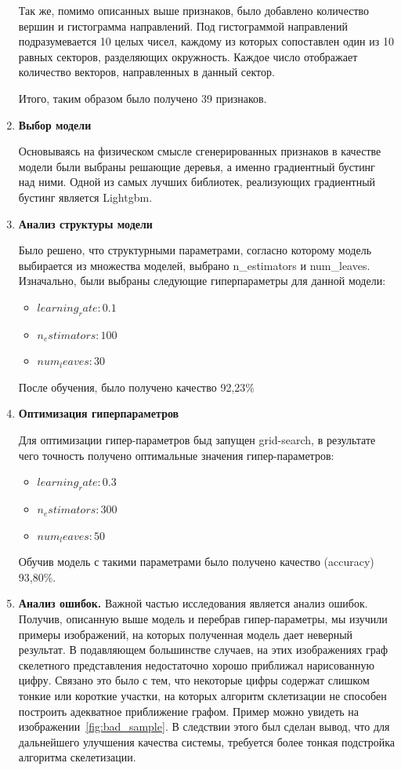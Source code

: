 \documentclass[12pt, twoside]{article}
\begin{document}
\begin{enumerate}
 Так же, помимо описанных выше признаков, было добавлено количество вершин и гистограмма направлений. Под гистограммой направлений подразумевается 10 целых чисел, каждому из которых сопоставлен один из 10 равных секторов, разделяющих окружность. Каждое число отображает количество векторов, направленных в данный сектор.
 
Итого, таким образом было получено 39 признаков. 

 \item  \textbf{Выбор модели}
 
Основываясь на физическом смысле сгенерированных признаков в качестве модели были выбраны решающие деревья, а именно градиентный бустинг над ними. Одной из самых лучших библиотек, реализующих градиентный бустинг является Lightgbm. 
 
 \item  \textbf{Анализ структуры модели} 
 
Было решено, что структурными параметрами, согласно которому модель выбирается из множества моделей, выбрано n_estimators и  num_leaves.
Изначально, были выбраны следующие гиперпараметры для данной модели: 

\begin{itemize}
	\item $learning_rate: 0.1$
	\item $n_estimators: 100$
	\item $num_leaves: 30$
\end{itemize}
 
После обучения, было получено качество 92,23\%
 
 \item  \textbf{Оптимизация гиперпараметров}
 
 Для оптимизации гипер-параметров быд запущен grid-search, в результате чего точность получено оптимальные значения гипер-параметров:
 
 \begin{itemize}
	\item $learning_rate: 0.3$
	\item $n_estimators: 300$
	\item $num_leaves: 50$
\end{itemize}

Обучив модель с такими параметрами было получено качество (accuracy) 93,80\%. 
 
 
 \item  \textbf{Анализ ошибок.}
 Важной частью исследования является анализ ошибок. Получив, описанную выше модель и перебрав гипер-параметры, мы изучили примеры изображений, на которых полученная модель дает неверный результат. В подавляющем большинстве случаев, на этих изображениях граф скелетного представления недостаточно хорошо приближал нарисованную цифру. Связано это было с тем, что некоторые цифры содержат слишком тонкие или короткие участки, на которых алгоритм склетизации не способен построить адекватное приближение графом. Пример можно увидеть на изображении~\ref{fig:bad_sample}. В следствии этого был сделан вывод, что для дальнейшего улучшения качества системы, требуется более тонкая подстройка алгоритма скелетизации.
 

\end{enumerate}
\end{document}
